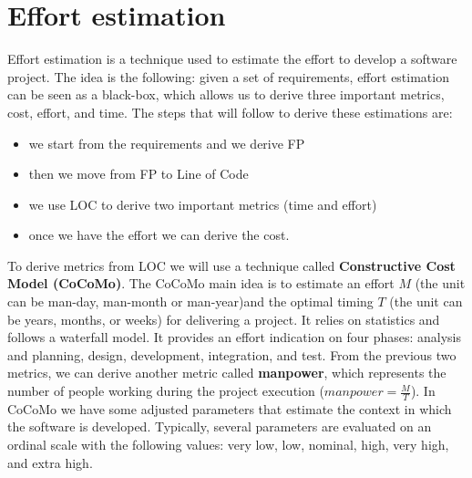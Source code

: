 \section{Effort estimation}
Effort estimation is a technique used to estimate the effort to develop a software project.
The idea is the following: given a set of requirements, effort estimation can be seen as a black-box, which allows us to derive three important metrics, cost, effort, and time.
The steps that will follow to derive these estimations are:
\begin{itemize}
    \item we start from the requirements and we derive FP
    \item then we move from FP to Line of Code
    \item we use LOC to derive two important metrics (time and effort)
    \item once we have the effort we can derive the cost.
\end{itemize}
To derive metrics from LOC we will use a technique called \textbf{Constructive Cost Model (CoCoMo)}.
The CoCoMo main idea is to estimate an effort $M$ (the unit can be man-day, man-month or man-year)and the optimal timing $T$ (the unit can be years, months, or weeks) for delivering a project.
It relies on statistics and follows a waterfall model.
It provides an effort indication on four phases: analysis and planning, design, development, integration, and test.
From the previous two metrics, we can derive another metric called \textbf{manpower}, which represents the number of people working during the project execution ($manpower = \frac{M}{T}$).
In CoCoMo we have some adjusted parameters that estimate the context in which the software is developed.
Typically, several parameters are evaluated on an ordinal scale with the following values: very low, low, nominal, high, very high, and extra high.


